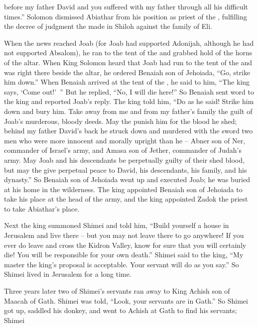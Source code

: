 {{}
before
my father
David
and you suffered
with my father
through
all
his difficult times.”
Solomon
dismissed
Abiathar
from his position as priest
of the {}, fulfilling
the decree
of judgment the
{}
made
in Shiloh
against
the family
of Eli.
\par }{\PP {}When the news
reached
Joab
(for
Joab
had supported
Adonijah,
although he had not
supported
Absalom), he
ran
to
the tent
of the {}
and grabbed hold
of the horns
of the altar.
When King
Solomon
heard
that
Joab
had run
to
the tent
of the {}
and was right there beside
the altar,
he
ordered
Benaiah
son
of Jehoiada, “Go,
strike
him down.”
When Benaiah
arrived
at
the tent
of the {}, he said
to
him, “The king
says,
‘Come out!’ ” But he replied,
“No,
I will die
here!” So Benaiah
sent
word
to the king
and reported
Joab’s
reply.
The king
told
him, “Do
as
he said! Strike
him down
and bury
him. Take away
from me and from my father’s
family
the guilt
of Joab’s
murderous,
bloody deeds.
May the
{}
punish him for the blood
he shed; behind my father
David’s
back
he struck down and murdered
with the sword
two
men
who
were more innocent
and morally
upright than he – Abner son of Ner, commander of Israel’s army, and Amasa son of Jether, commander of Judah’s army.
May Joab
and his descendants
be perpetually
guilty of their shed blood,
but may
the {}
give perpetual
peace
to
David,
his descendants,
his family,
and his dynasty.”
So
Benaiah
son
of Jehoiada
went up
and executed
Joab; he was buried
at his home
in the wilderness.
The
king
appointed Benaiah
son
of Jehoiada
to take his place
at the head of the army,
and the king
appointed
Zadok
the priest
to take Abiathar’s
place.
\par }{\PP {}Next
the king
summoned
Shimei
and told
him, “Build
yourself a house
in Jerusalem
and live
there
– but you may not
leave
there
to go anywhere!
If
you ever
do leave
and cross
the Kidron
Valley,
know
for
sure
that you will certainly
die! You will be
responsible
for your own death.”
Shimei
said
to the king,
“My master
the king’s
proposal
is
acceptable.
Your servant
will do
as
you say.”
So Shimei
lived
in Jerusalem
for a long time.
\par }{\PP {}Three
years
later
two
of Shimei’s
servants
ran away
to
King
Achish
son
of Maacah
of Gath.
Shimei
was told,
“Look,
your servants
are in Gath.”
So Shimei
got
up, saddled
his donkey,
and went
to
Achish
at Gath
to
find
his servants;
Shimei
}
